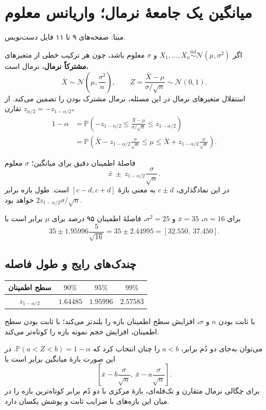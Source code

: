 \documentclass[12pt,a4paper,oneside]{report}
\newcounter{ex}[chapter]
\newenvironment{example}[1]{\refstepcounter{ex}\begin{tcolorbox}[breakable=false,title={مثال \thechapter.\arabic{ex} | #1},colframe=muted,colback=white]}{\end{tcolorbox}}
\newcommand{\source}[1]{\par{\small\color{muted} مبنا: صفحه‌های #1 فایل دست‌نویس.}\par}
\newcommand{\iid}{\overset{\mathrm{iid}}{\sim}}
\newcommand{\N}{\mathcal N}
\newcommand{\Prob}{\mathbb P}
\begin{document}
\section{میانگین یک جامعهٔ نرمال؛ واریانس معلوم}
\source{۹ تا ۱۱}
اگر $X_1,\ldots,X_n\iid\N(\mu,\sigma^2)$ و $\sigma$ معلوم باشد، چون هر ترکیب خطی از متغیرهای \textbf{مشترکاً نرمال}، نرمال است،
\[
\bar X\sim\N\left(\mu,\frac{\sigma^2}{n}\right),\qquad
Z=\frac{\bar X-\mu}{\sigma/\sqrt n}\sim\N(0,1).
\]
استقلال متغیرهای نرمال در این مسئله، نرمال مشترک بودن را تضمین می‌کند. از تقارن $z_{\alpha/2}=-z_{1-\alpha/2}$،
\begin{align*}
1-\alpha
&=\Prob\left(-z_{1-\alpha/2}\le\frac{\bar X-\mu}{\sigma/\sqrt n}\le z_{1-\alpha/2}\right)\\
&=\Prob\left(\bar X-z_{1-\alpha/2}\frac\sigma{\sqrt n}
\le\mu\le\bar X+z_{1-\alpha/2}\frac\sigma{\sqrt n}\right).
\end{align*}
\begin{result}{فاصلهٔ اطمینان دقیق برای میانگین؛ $\sigma$ معلوم}
\[
\boxed{\bar x\ \pm\ z_{1-\alpha/2}\frac\sigma{\sqrt n}.}
\]
در این نمادگذاری، $c\pm d$ به معنی بازهٔ $[c-d,c+d]$ است. طول بازه برابر $2z_{1-\alpha/2}\sigma/\sqrt n$ خواهد بود.
\end{result}
\begin{example}{نمونهٔ نرمال با واریانس ۲۵}
برای $n=16$، $\bar x=35$ و $\sigma^2=25$، فاصلهٔ اطمینان ۹۵ درصد برای $\mu$ برابر است با
\[
35\pm1.95996\frac5{\sqrt{16}}
=35\pm2.44995
=\boxed{[32.550,\ 37.450]}.
\]
\end{example}
\subsection{چندک‌های رایج و طول فاصله}
\begin{center}
\begin{tabular}{c|ccc}
\toprule
سطح اطمینان&$90\%$&$95\%$&$99\%$\\
\midrule
$z_{1-\alpha/2}$&$1.64485$&$1.95996$&$2.57583$\\
\bottomrule
\end{tabular}
\end{center}
با ثابت بودن $n$ و $\sigma$، افزایش سطح اطمینان بازه را بلندتر می‌کند؛ با ثابت بودن سطح اطمینان، افزایش حجم نمونه بازه را کوتاه‌تر می‌کند.

می‌توان به‌جای دو دُم برابر، $a<b$ را چنان انتخاب کرد که $\Prob(a<Z<b)=1-\alpha$. در این صورت بازهٔ میانگین برابر است با
\[\left[\bar x-b\frac\sigma{\sqrt n},\ \bar x-a\frac\sigma{\sqrt n}\right].\]
برای چگالی نرمال متقارن و تک‌قله‌ای، بازهٔ مرکزی با دو دُم برابر کوتاه‌ترین بازه را در میان این بازه‌های با ضرایب ثابت و پوشش یکسان دارد.
\end{document}
